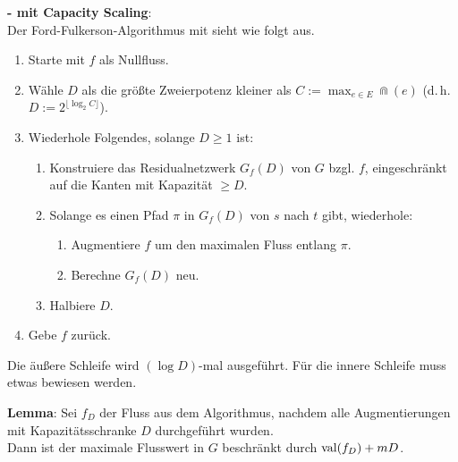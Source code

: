 \textbf{- mit Capacity Scaling}:\\
Der Ford-Fulkerson-Algorithmus mit  sieht wie folgt aus.
\begin{enumerate}
    \item
    Starte mit $f$ als Nullfluss.

    \item
    Wähle $D$ als die größte Zweierpotenz kleiner als $C := \max_{e \in E} \Cap(e)$
    (d.\,h. $D := 2^{\lfloor \log_2 C \rfloor}$).

    \item
    Wiederhole Folgendes, solange $D \ge 1$ ist:
    \begin{enumerate}
        \item
        Konstruiere das Residualnetzwerk $G_f(D)$ von $G$ bzgl. $f$,
        eingeschränkt auf die Kanten mit Kapazität $\ge D$.

        \item
        Solange es einen Pfad $\pi$ in $G_f(D)$ von $s$ nach $t$ gibt, wiederhole:
        \begin{enumerate}
            \item
            Augmentiere $f$ um den maximalen Fluss entlang $\pi$.

            \item
            Berechne $G_f(D)$ neu.
        \end{enumerate}

        \item
        Halbiere $D$.
    \end{enumerate}

    \item
    Gebe $f$ zurück.
\end{enumerate}

\linie

Die äußere Schleife wird $(\log D)$-mal ausgeführt.
Für die innere Schleife muss etwas bewiesen werden.

\textbf{Lemma}:
Sei $f_D$ der Fluss aus dem Algorithmus, nachdem alle Augmentierungen mit Kapazitätsschranke $D$
durchgeführt wurden.\\
Dann ist der maximale Flusswert in $G$ beschränkt durch $\operatorname{val}(f_D) + mD$.


